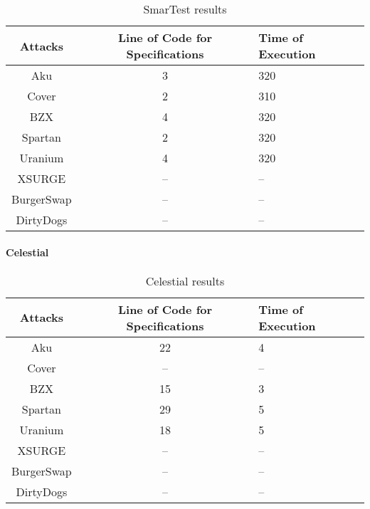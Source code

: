 \begin{center}
    \begin{table*}
        \caption{SmarTest results}
            \label{tab:SmarTestTable}
            \begin{tabular}{ccl}
            \toprule
                Attacks & Line of Code for Specifications & Time of Execution\\
                \midrule
                Aku & 3 & 320 \\ 
                Cover & 2 & 310\\ 
                BZX  & 4 & 320 \\ 
                Spartan & 2 & 320\\ 
                Uranium  & 4 & 320 \\ 
                XSURGE &  -- & -- \\  
                BurgerSwap &  -- & --\\ 
                DirtyDogs &  -- & -- \\
            \bottomrule
            \end{tabular}
        \end{table*}
\end{center}


\paragraph{Celestial}

\begin{center}
    \begin{table*}
        \caption{Celestial results}
            \label{tab:CelestialTable}
                \begin{tabular}{ccl}
                \toprule
                    Attacks & Line of Code for Specifications & Time of Execution\\
                    \midrule
                    Aku & 22 & 4\\ 
                    Cover & --  & -- \\ 
                    BZX & 15 & 3\\ 
                    Spartan & 29 &  5\\ 
                    Uranium & 18 &  5\\ 
                    XSURGE &  -- & -- \\  
                    BurgerSwap &  -- & --\\ 
                    DirtyDogs &  -- & -- \\
                \bottomrule
                \end{tabular}
    \end{table*}
        
\end{center}

